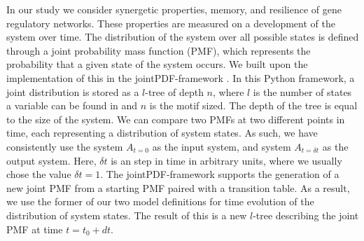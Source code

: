 \documentclass[../main.tex]{subfiles}
\begin{document}
In our study we consider synergetic properties, memory, and resilience of gene regulatory networks.
These properties are measured on a development of the system over time.
The distribution of the system over all possible states is defined through a joint probability mass function (PMF), which represents the probability that a given state of the system occurs.
We built upon the implementation of this in the jointPDF-framework \cite{jointpdf}.
In this Python framework, a joint distribution is stored as a $l$-tree of depth $n$, where $l$ is the number of states a variable can be found in and $n$ is the motif sized.
The depth of the tree is equal to the size of the system.
We can compare two PMFs at two different points in time, each representing a distribution of system states.
As such, we have consistently use the system $A_{t=0}$ as the input system, and system $A_{t=\delta t}$ as the output system.
Here, $\delta t$ is an step in time in arbitrary units, where we usually chose the value $\delta t = 1$. 
The jointPDF-framework supports the generation of a new joint PMF from a starting PMF paired with a transition table.
As a result, we use the former of our two model definitions for time evolution of the distribution of system states.
The result of this is a new $l$-tree describing the joint PMF at time $t=t_0+dt$.
\end{document}
